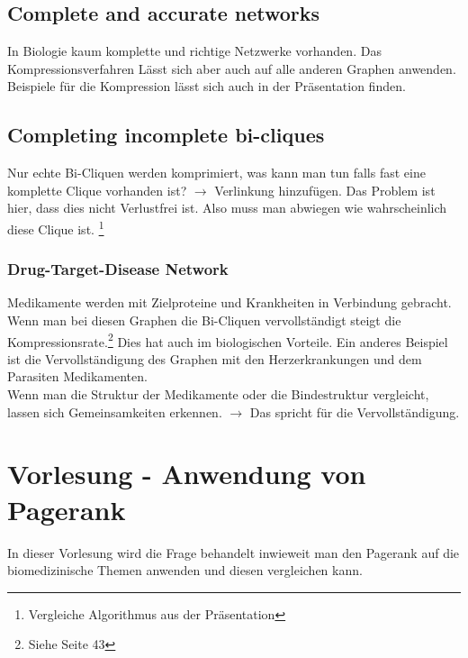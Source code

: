 \documentclass{article}
\begin{document}
\subsection{Complete and accurate networks}
In Biologie kaum komplette und richtige Netzwerke vorhanden. Das Kompressionsverfahren
Lässt sich aber auch auf alle anderen Graphen anwenden. Beispiele für die Kompression
lässt sich auch in der Präsentation finden.
\subsection{Completing incomplete bi-cliques}
Nur echte Bi-Cliquen werden komprimiert, was kann man tun falls fast eine komplette
Clique vorhanden ist? $\rightarrow$ Verlinkung hinzufügen. Das Problem ist hier,
dass dies nicht Verlustfrei ist. Also muss man abwiegen wie wahrscheinlich diese
Clique ist. \footnote{Vergleiche Algorithmus aus der Präsentation}
\subsubsection{Drug-Target-Disease Network}
Medikamente werden mit Zielproteine und Krankheiten in Verbindung gebracht.
Wenn man bei diesen Graphen die Bi-Cliquen vervollständigt steigt die 
Kompressionsrate.\footnote{Siehe Seite 43} Dies hat auch im biologischen
Vorteile. Ein anderes Beispiel ist die Vervollständigung des Graphen mit den
Herzerkrankungen und dem Parasiten Medikamenten.\\
Wenn man die Struktur der Medikamente oder die Bindestruktur vergleicht, lassen
sich Gemeinsamkeiten erkennen. $\rightarrow$ Das spricht für die Vervollständigung.

\newpage
\section{Vorlesung - Anwendung von Pagerank}
In dieser Vorlesung wird die Frage behandelt inwieweit man den Pagerank auf die biomedizinische Themen anwenden und diesen vergleichen kann.
\end{document}
